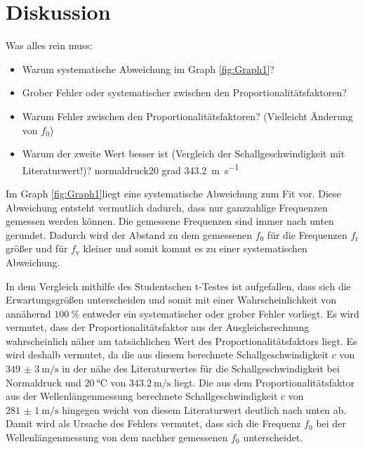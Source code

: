 
\section{Diskussion}
\label{sec:Diskussion}

Was alles rein muss:
\begin{itemize}
	\item Warum systematische Abweichung im Graph \ref{fig:Graph1}? 
	\item Grober Fehler oder systematischer zwischen den Proportionalitätsfaktoren?
	\item Warum Fehler zwischen den Proportionalitätsfaktoren? (Vielleicht Änderung von $f_0$)
	\item Warum der zweite Wert besser ist (Vergleich der Schallgeschwindigkeit mit Literaturwert!)? normaldruck20 grad \SI{343.2}{\meter\per\second} \cite{c}
	
\end{itemize}

Im Graph \ref{fig:Graph1}liegt eine systematische Abweichung zum Fit vor. Diese Abweichung entsteht vermutlich dadurch, dass nur ganzzahlige Frequenzen gemessen werden können. Die gemessene Frequenzen sind immer nach unten gerundet. Dadurch wird der Abstand zu dem gemessenen $f_0$ für die Frequenzen $f_\text{r}$ größer und für $f_\text{v}$ kleiner und somit kommt es zu einer systematischen Abweichung.


In dem Vergleich mithilfe des Studentschen t-Testes ist aufgefallen, dass sich die Erwartungsgrößen unterscheiden und somit mit einer Wahrscheinlichkeit von annähernd $\SI{100}{\percent}$ entweder ein systematischer oder grober Fehler vorliegt. Es wird vermutet, dass der Proportionalitätsfaktor aus der Ausgleichsrechnung wahrscheinlich näher am tatsächlichen Wert des Proportionalitätsfaktors liegt. Es wird deshalb vermutet, da die aus diesem berechnete Schallgeschwindigkeit $c$ von $\SI{349(3)}{\meter\per\second}$ in der nähe des Literaturwertes für die Schallgeschwindigkeit bei Normaldruck und $\SI{20}{\celsius}$ von  $\SI{343.2}{\meter\per\second}$ \cite{c} liegt. Die aus dem Proportionalitätsfaktor aus der Wellenlängenmessung berechnete Schallgeschwindigkeit $c$ von $\SI{281(1)}{\meter\per\second}$ hingegen weicht von diesem Literaturwert deutlich nach unten ab. Damit wird als Ursache des Fehlers vermutet, dass sich die Frequenz $f_0$ bei der Wellenlängenmessung von dem nachher gemessenen $f_0$ unterscheidet. 